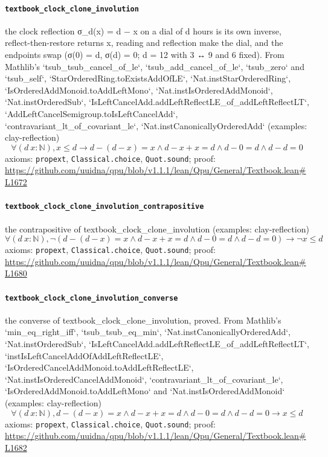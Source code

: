 \documentclass[11pt]{article}
\begin{document}
\paragraph{\texttt{textbook\_clock\_clone\_involution}}
the clock reflection σ\_d(x) = d − x on a dial of d hours is its own inverse, reflect-then-restore returns x, reading and reflection make the dial, and the endpoints swap (σ(0) = d, σ(d) = 0; d = 12 with 3 ↔ 9 and 6 fixed). From Mathlib's `tsub\_tsub\_cancel\_of\_le`, `tsub\_add\_cancel\_of\_le`, `tsub\_zero` and `tsub\_self`, `StarOrderedRing.toExistsAddOfLE`, `Nat.instStarOrderedRing`, `IsOrderedAddMonoid.toAddLeftMono`, `Nat.instIsOrderedAddMonoid`, `Nat.instOrderedSub`, `IsLeftCancelAdd.addLeftReflectLE\_of\_addLeftReflectLT`, `AddLeftCancelSemigroup.toIsLeftCancelAdd`, `contravariant\_lt\_of\_covariant\_le`, `Nat.instCanonicallyOrderedAdd` (examples: clay-reflection)
\[ \forall (d\ x : \mathbb{N}), x \le d \to d - (d - x) = x \land d - x + x = d \land d - 0 = d \land d - d = 0 \]
\noindent axioms: \texttt{propext}, \texttt{Classical.choice}, \texttt{Quot.sound}; proof: \url{https://github.com/uuidna/qpu/blob/v1.1.1/lean/Qpu/General/Textbook.lean\#L1672}

\paragraph{\texttt{textbook\_clock\_clone\_involution\_contrapositive}}
the contrapositive of textbook\_clock\_clone\_involution (examples: clay-reflection)
\[ \forall (d\ x : \mathbb{N}), \neg (d - (d - x) = x \land d - x + x = d \land d - 0 = d \land d - d = 0) \to \neg x \le d \]
\noindent axioms: \texttt{propext}, \texttt{Classical.choice}, \texttt{Quot.sound}; proof: \url{https://github.com/uuidna/qpu/blob/v1.1.1/lean/Qpu/General/Textbook.lean\#L1680}

\paragraph{\texttt{textbook\_clock\_clone\_involution\_converse}}
the converse of textbook\_clock\_clone\_involution, proved. From Mathlib's `min\_eq\_right\_iff`, `tsub\_tsub\_eq\_min`, `Nat.instCanonicallyOrderedAdd`, `Nat.instOrderedSub`, `IsLeftCancelAdd.addLeftReflectLE\_of\_addLeftReflectLT`, `instIsLeftCancelAddOfAddLeftReflectLE`, `IsOrderedCancelAddMonoid.toAddLeftReflectLE`, `Nat.instIsOrderedCancelAddMonoid`, `contravariant\_lt\_of\_covariant\_le`, `IsOrderedAddMonoid.toAddLeftMono` and `Nat.instIsOrderedAddMonoid` (examples: clay-reflection)
\[ \forall (d\ x : \mathbb{N}), d - (d - x) = x \land d - x + x = d \land d - 0 = d \land d - d = 0 \to x \le d \]
\noindent axioms: \texttt{propext}, \texttt{Classical.choice}, \texttt{Quot.sound}; proof: \url{https://github.com/uuidna/qpu/blob/v1.1.1/lean/Qpu/General/Textbook.lean\#L1682}
\end{document}

